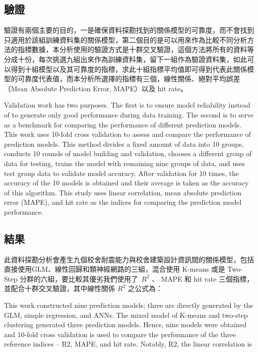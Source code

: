 \subsection{驗證}

驗證有兩個主要的目的，一是確保資料探勘找到的關係模型的可靠度，而不會找到只適用於該組訓練資料集的關係模型，第二個目的是可以用來作為比較不同分析方法的指標數據，本分析使用的驗證方式是十群交叉驗證，這個方法將所有的資料等分成十份，每次挑選九組出來作為訓練資料集，留下一組作為驗證資料集，如此可以得到十組模型以及其可靠度的指標，求此十組指標平均值即可得到代表此關係模型的可靠度代表值，而本分析所選擇的指標有三個，線性關係、絕對平均誤差（Mean Absolute Prediction Error, MAPE）以及 hit rate。

Validation work has two purposes. The first is to ensure model reliability instead of to generate only good performance during data training. The second is to serve as a benchmark for comparing the performance of different prediction models. This work uses 10-fold cross validation to assess and compare the performance of prediction models. This method divides a fixed amount of data into 10 groups, conducts 10 rounds of model building and validation, chooses a different group of data for testing, trains the model with remaining nine groups of data, and uses test group data to validate model accuracy. After validation for 10 times, the accuracy of the 10 models is obtained and their average is taken as the accuracy of this algorithm. This study uses linear correlation, mean absolute prediction error (MAPE), and hit rate as the indices for comparing the prediction model performance.

\subsection{結果}

此資料探勘分析會產生九個校舍耐震能力與校舍建築設計資訊間的關係模型，包括直接使用GLM、線性回歸和類神經網路的三組，混合使用 K-means 或是 Two-Step 分群的六組，要比較其優劣我們使用了~$R^2$ 、 MAPE 和 hit rate 三個指標，並配合十群交叉驗證，其中線性關係 $R^2$ 之公式為：

This work constructed nine prediction models; three are directly generated by the GLM, simple regression, and ANNs. The mixed model of K-means and two-step clustering generated three prediction models. Hence, nine models were obtained and 10-fold cross validation is used to compare the performance of the three reference indices – R2, MAPE, and hit rate. Notably, R2, the linear correlation is


